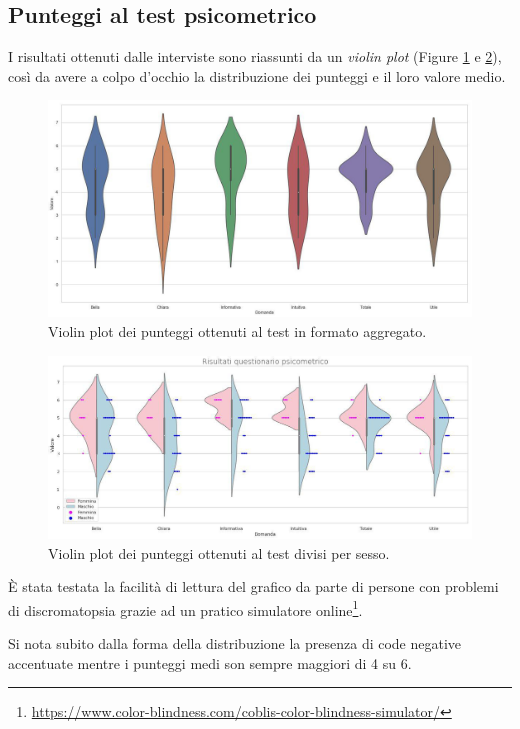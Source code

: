 \documentclass[12pt, a4paper, twocolumn]{article} %
\begin{document}
\subsection{Punteggi al test psicometrico}
I risultati ottenuti dalle interviste sono riassunti da un \textit{violin plot} (Figure \ref{plot:violin} e \ref{plot:violin_fm}), così da avere a colpo d'occhio la distribuzione dei punteggi e il loro valore medio.
\begin{figure}[p]
  \includegraphics[width=\textwidth]{violin_plot.jpg}
  \caption{Violin plot dei punteggi ottenuti al test in formato aggregato.}
  \label{plot:violin}
\end{figure}
\begin{figure}[p]
  \includegraphics[width=\textwidth]{violin_plot_fm.jpg}
  \caption{Violin plot dei punteggi ottenuti al test divisi per sesso.}
  \label{plot:violin_fm}
\end{figure}
È stata testata la facilità di lettura del grafico da parte di persone con problemi di discromatopsia grazie ad un pratico simulatore online\footnote{\url{https://www.color-blindness.com/coblis-color-blindness-simulator/}}.

Si nota subito dalla forma della distribuzione la presenza di code negative accentuate mentre i punteggi medi son sempre maggiori di 4 su 6.
\end{document}

